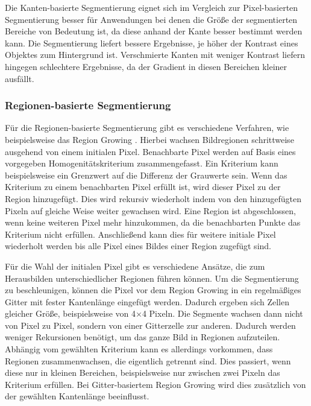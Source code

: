 Die Kanten-basierte Segmentierung eignet sich im Vergleich zur Pixel-basierten Segmentierung besser für Anwendungen bei denen die Größe der segmentierten Be\-rei\-che von Bedeutung ist, da diese anhand der Kante besser bestimmt werden kann. Die Segmentierung liefert bessere Ergebnisse, je höher der Kontrast eines Objektes zum Hintergrund ist. Verschmierte Kanten mit weniger Kontrast liefern hingegen schlechtere Ergebnisse, da der Gradient in diesen Bereichen kleiner ausfällt. 

\subsubsection[Regionen-basierte Segmentierung (Schmelzer)]{Regionen-basierte Segmentierung}

Für die Regionen-basierte Segmentierung gibt es verschiedene Verfahren, wie bei\-spiels\-wei\-se das Region Growing \cite{Burger2015}. Hierbei wachsen Bildregionen schritt\-wei\-se ausgehend von einem initialen Pixel. Benachbarte Pixel werden auf Basis eines vorgegeben Homogenitätskriterium zusammengefasst. Ein Kriterium kann bei\-spiels\-wei\-se ein Grenz\-wert auf die Differenz der Grauwerte sein. Wenn das Kriterium zu einem benachbarten Pixel erfüllt ist, wird dieser Pixel zu der Region hinzugefügt. Dies wird rekursiv wiederholt indem von den hinzugefügten Pixeln auf gleiche Weise wei\-ter gewachsen wird. Eine Region ist abgeschlossen, wenn keine weiteren Pixel mehr hinzukommen, da die benachbarten Punkte das Kriterium nicht erfüllen. Anschließend kann dies für weitere initiale Pixel wiederholt werden bis alle Pixel eines Bildes einer Region zugefügt sind. 

Für die  Wahl der initialen Pixel gibt es verschiedene Ansätze, die zum Herausbilden unterschiedlicher Regionen führen können. Um die Segmentierung zu beschleunigen, können die Pixel vor dem Region Growing in ein regelmäßiges Gitter mit fester Kantenlänge eingefügt werden. Dadurch ergeben sich Zellen gleicher Größe, beispielsweise von 4$\times$4  Pixeln. Die Segmente wachsen dann nicht von Pixel zu Pixel, sondern von einer Gitterzelle zur anderen. Dadurch werden weniger Rekursionen benötigt, um das ganze Bild in Regionen aufzuteilen. Abhängig vom gewählten Kriterium kann es al\-ler\-dings vorkommen, dass Regionen zusammenwachsen, die eigentlich getrennt sind. Dies passiert, wenn diese nur in kleinen Bereichen, beispielsweise nur zwischen zwei Pixeln das Kriterium erfüllen. Bei Gitter-basiertem Region Growing wird dies zusätzlich von der gewählten Kantenlänge beeinflusst. 

